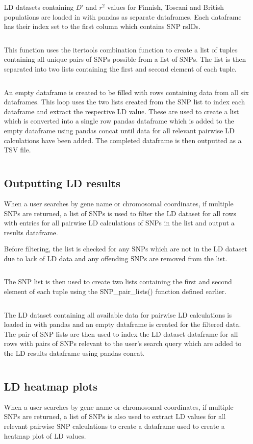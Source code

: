 \documentclass[12pt,a4paper]{article}
\newcommand{\mintfile}[1]{
\begin{tcolorbox}[colback=gray!5!white,%
	grow to left by=20mm,
    grow to right by=20mm,
    sharp corners]{{    \small \inputminted[breaklines]{python}{#1}		}}
\end{tcolorbox}}
\newcommand{\subsect}[1]{
\hypertarget{#1}{
\subsection{#1}\label{#1}}
}
\begin{document}
LD datasets containing $D’$ and $r^2$  values for Finnish, Toscani and British populations are loaded in with pandas as separate dataframes. Each dataframe has their index set to the first column which contains SNP rsIDs.
\mintfile{code_snippets/placeholder.py}

This function uses the itertools combination function to create a list of tuples containing all unique pairs of SNPs possible from a list of SNPs. The list is then separated into two lists containing the first and second element of each tuple.
\mintfile{code_snippets/placeholder.py}

An empty dataframe is created to be filled with rows containing data from all six dataframes. This loop uses the two lists created from the SNP list to index each dataframe and extract the respective LD value. These are used to create a list which is converted into a single row pandas dataframe which is added to the empty dataframe using pandas concat until data for all relevant pairwise LD calculations have been added. The completed dataframe is then outputted as a TSV file.
\mintfile{code_snippets/placeholder.py}


\subsect{Outputting LD results}
When a user searches by gene name or chromosomal coordinates, if multiple SNPs are returned, a list of SNPs is used to filter the LD dataset for all rows with entries for all pairwise LD calculations of SNPs in the list and output a results dataframe.


Before filtering, the list is checked for any SNPs which are not in the LD dataset due to lack of LD data and any offending SNPs are removed from the list.
\mintfile{code_snippets/placeholder.py}

The SNP list is then used to create two lists containing the first and second element of each tuple using the SNP\_pair\_lists() function defined earlier.
\mintfile{code_snippets/placeholder.py}


The LD dataset containing all available data for pairwise LD calculations is loaded in with pandas and an empty dataframe is created for the filtered data. The pair of SNP lists are then used to index the LD dataset dataframe for all rows with pairs of SNPs relevant to the user’s search query which are added to the LD results dataframe using pandas concat.
\mintfile{code_snippets/placeholder.py}

\subsect{LD heatmap plots}

When a user searches by gene name or chromosomal coordinates, if multiple SNPs are returned, a list of SNPs is also used to extract LD values for all relevant pairwise SNP calculations to create a dataframe used to create a heatmap plot of LD values.
\end{document}

